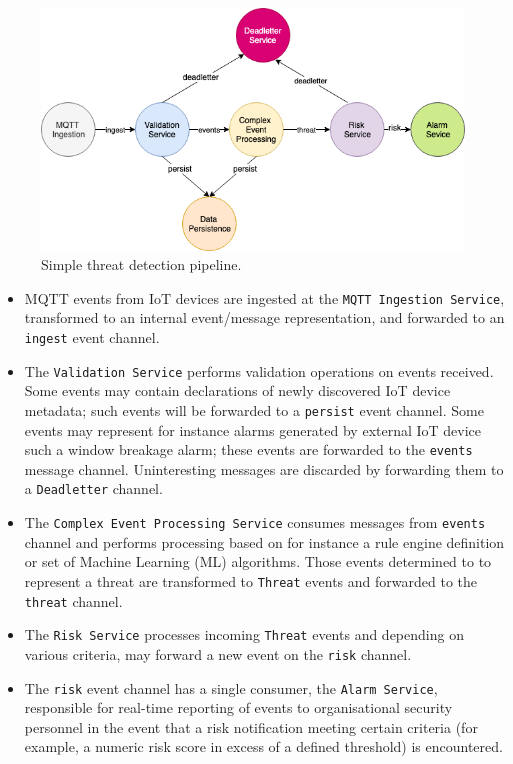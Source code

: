 \vspace{5mm}

\begin{figure}[H]
	\centering  
	\includegraphics[scale=0.6]{figures/background/threat_detection_pipeline.png}
	\caption{Simple threat detection pipeline.}
	\label{threat_detection_pipeline}
\end{figure}

\begin{itemize}
	\item MQTT events from IoT devices are ingested at the \texttt{MQTT Ingestion Service}, transformed to an internal event/message representation, and forwarded to an \texttt{ingest} event channel.
	\item The \texttt{Validation Service} performs validation operations on events received. Some events may contain declarations of newly discovered IoT device metadata; such events will be forwarded to a \texttt{persist} event channel. Some events may represent for instance alarms generated by external IoT device such a window breakage alarm; these events are forwarded to the  \texttt{events} message channel. Uninteresting messages are discarded by forwarding them to a \texttt{Deadletter} channel.
	\item The \texttt{Complex Event Processing Service} consumes messages from \texttt{events} channel and performs processing based on for instance a rule engine definition or set of Machine Learning (ML) algorithms. Those events determined to to represent a threat are transformed to \texttt{Threat} events and forwarded to the \texttt{threat} channel. 
	\item The \texttt{Risk Service} processes incoming \texttt{Threat} events and depending on various criteria, may forward a new event on the \texttt{risk} channel.
	\item The \texttt{risk} event channel has a single consumer, the \texttt{Alarm Service}, responsible for real-time reporting of events to organisational security personnel in the event that a risk notification meeting certain criteria (for example, a numeric risk score in excess of a defined threshold) is encountered.
	
\end{itemize} 


